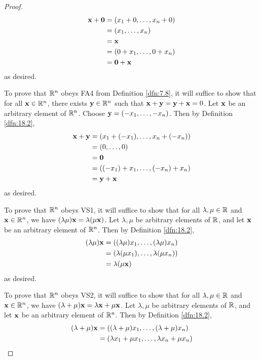 \documentclass[../main.tex]{subfiles}
\begin{document}
\begin{exercise}
\begin{proof}
        \begin{align*}
            \mathbf{x}+\bm{0} &= (x_1+0,\dots,x_n+0)\\
            &= (x_1,\dots,x_n)\\
            &= \mathbf{x}\\
            &= (0+x_1,\dots,0+x_n)\\
            &= \bm{0}+\mathbf{x}
        \end{align*}
        as desired.\par
        To prove that $\mathbb{R}^n$ obeys FA4 from Definition \ref{dfn:7.8}, it will suffice to show that for all $\mathbf{x}\in\mathbb{R}^n$, there exists $\mathbf{y}\in\mathbb{R}^n$ such that $\mathbf{x}+\mathbf{y}=\mathbf{y}+\mathbf{x}=0$. Let $\mathbf{x}$ be an arbitrary element of $\mathbb{R}^n$. Choose $\mathbf{y}=(-x_1,\dots,-x_n)$. Then by Definition \ref{dfn:18.2},
        \begin{align*}
            \mathbf{x}+\mathbf{y} &= (x_1+(-x_1),\dots,x_n+(-x_n))\\
            &= (0,\dots,0)\\
            &= \bm{0}\\
            &= ((-x_1)+x_1,\dots,(-x_n)+x_n)\\
            &= \mathbf{y}+\mathbf{x}
        \end{align*}
        as desired.\par
        To prove that $\mathbb{R}^n$ obeys VS1, it will suffice to show that for all $\lambda,\mu\in\mathbb{R}$ and $\mathbf{x}\in\mathbb{R}^n$, we have $(\lambda\mu)\mathbf{x}=\lambda(\mu\mathbf{x})$. Let $\lambda,\mu$ be arbitrary elements of $\mathbb{R}$, and let $\mathbf{x}$ be an arbitrary element of $\mathbb{R}^n$. Then by Definition \ref{dfn:18.2},
        \begin{align*}
            (\lambda\mu)\mathbf{x} &= ((\lambda\mu)x_1,\dots,(\lambda\mu)x_n)\\
            &= (\lambda(\mu x_1),\dots,\lambda(\mu x_n))\\
            &= \lambda(\mu\mathbf{x})
        \end{align*}
        as desired.\par
        To prove that $\mathbb{R}^n$ obeys VS2, it will suffice to show that for all $\lambda,\mu\in\mathbb{R}$ and $\mathbf{x}\in\mathbb{R}^n$, we have $(\lambda+\mu)\mathbf{x}=\lambda\mathbf{x}+\mu\mathbf{x}$. Let $\lambda,\mu$ be arbitrary elements of $\mathbb{R}$, and let $\mathbf{x}$ be an arbitrary element of $\mathbb{R}^n$. Then by Definition \ref{dfn:18.2},
        \begin{align*}
            (\lambda+\mu)\x &= ((\lambda+\mu)x_1,\dots,(\lambda+\mu)x_n)\\
            &= (\lambda x_1+\mu x_1,\dots,\lambda x_n+\mu x_n)\\

\end{align*}
\end{proof}
\end{exercise}
\end{document}
